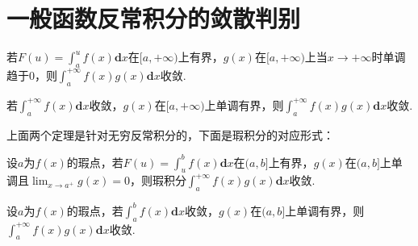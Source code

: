 \section{一般函数反常积分的敛散判别}

\begin{theorem}[Dirichlet判别法]
	若$F(u) = \int_{a}^{u}f(x)\textbf{d}x$在$[a,+\infty)$上有界，$g(x)$在$[a,+\infty)$上当$x\to +\infty$时单调趋于0，则$\int_{a}^{+\infty}f(x)g(x)\textbf{d}x$收敛.
\end{theorem}

\begin{theorem}[Albel判别法]
	若$\int_{a}^{+\infty}f(x)\textbf{d}x$收敛，$g(x)$在$[a,+\infty)$上单调有界，则$\int_{a}^{+\infty}f(x)g(x)\textbf{d}x$收敛.
\end{theorem}

上面两个定理是针对无穷反常积分的，下面是瑕积分的对应形式：

\begin{theorem}[Dirichlet判别法]
	设$a$为$f(x)$的瑕点，若$F(u) = \int_{u}^{b}f(x)\textbf{d}x$在$(a,b]$上有界，$g(x)$在$(a,b]$上单调且$\displaystyle\lim_{x\to a^+}g(x)=0$，则瑕积分$\int_{a}^{+\infty}f(x)g(x)\textbf{d}x$收敛.
\end{theorem}

\begin{theorem}[Albel判别法]
	设$a$为$f(x)$的瑕点，若$\int_{a}^{b}f(x)\textbf{d}x$收敛，$g(x)$在$(a,b]$上单调有界，则$\int_{a}^{+\infty}f(x)g(x)\textbf{d}x$收敛.
\end{theorem}